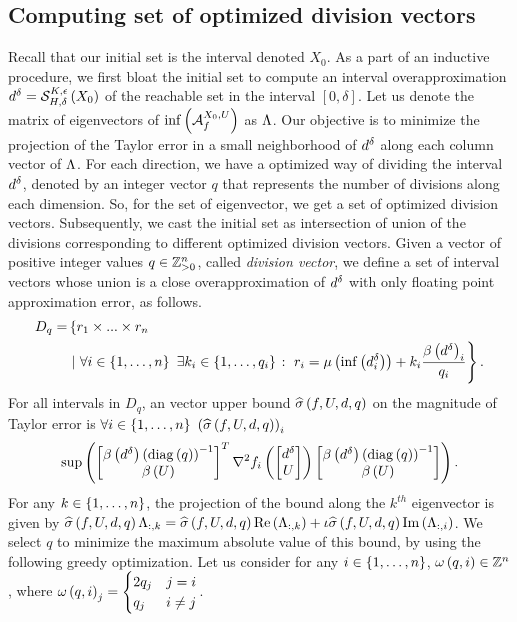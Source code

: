 \subsection{Computing set of optimized division vectors}
Recall that our initial set is the interval denoted $X_0$.  As a part
of an inductive procedure, we first bloat the initial set to compute
an interval overapproximation $d^{\delta}
= \mathcal{S}_{H,\delta}^{K,\epsilon}\left(X_0\right)$ of the reachable set in the
interval $[0,\delta]$.  Let us denote the matrix of eigenvectors of
$\inf\left(\mathcal{A}_{f}^{X_0,U}\right)$ as $\Lambda$.  Our objective is to minimize
the projection of the Taylor error in a small neighborhood of $d^{\delta}$
along each column vector of $\Lambda$.  For each direction, we have a
optimized way of dividing the interval $d^{\delta}$, denoted by an
integer vector $q$ that represents the number of divisions along each
dimension.  So, for the set of eigenvector, we get a set of optimized
division vectors.  Subsequently, we cast the initial set as
intersection of union of the divisions corresponding to different
optimized division vectors.  Given a vector of positive integer values
$q\in\mathbb{Z}_{>0}^n$, called \emph{division vector}, we define a set
of interval vectors whose union is a close overapproximation of
$d^{\delta}$ with only floating point approximation error, as follows.
%
\begin{align*}
D_q
= & \left\{r_1\times...\times r_n\right.\\
& \left.\left|~\forall i\in\left\{1,\ldots,n\right\}~\exists k_i\in\left\{1,\ldots,q_i\right\}\right.:~r_i
= \mu\left(\inf\left(d^\delta_i\right)\right)+k_i\frac{\beta\left(d^\delta\right)_i}{q_i}\right\}.
\end{align*}
%
For all intervals in $D_q$, an vector upper bound
$\widehat{\sigma}\left(f,U,d,q\right)$ on the magnitude of Taylor error is
$\forall i\in\left\{1,\ldots,n\right\}~\left(\widehat{\sigma}\left(f,U,d,q\right)\right)_i$
%
\begin{align*}
\sup\left(\begin{bmatrix}\beta\left(d^{\delta}\right)\left(\operatorname{diag}\left(q\right)\right)^{-1}\\ \beta\left(U\right)\end{bmatrix}^T{\nabla^2
f_i}\left(\begin{bmatrix}d^{\delta}\\ U\end{bmatrix}\right)\begin{bmatrix}\beta\left(d^{\delta}\right)\left(\operatorname{diag}\left(q\right)\right)^{-1}\\ \beta\left(U\right)\end{bmatrix}\right).
\end{align*}
%
For any $k\in\left\{1,\ldots,n\right\}$, the projection of the  bound
along the $k^{th}$ eigenvector is given by
$\widehat{\sigma}\left(f,U,d,q\right)\Lambda_{:,k}
= \widehat{\sigma}\left(f,U,d,q\right)\operatorname{Re}\left(\Lambda_{:,k}\right)
+ \iota\widehat{\sigma}\left(f,U,d,q\right)\operatorname{Im}\left(\Lambda_{:,i}\right)$.  We select $q$ to
minimize the maximum absolute value of this bound, by using the
following greedy optimization.  Let us consider for any
$i\in\left\{1,\ldots,n\right\}$, \mbox{$\omega\left(q,i\right)\in\mathbb{Z}^n$}, where $\omega\left(q,i\right)_j
= \begin{cases}2q_j & j=i\\ q_j & i\neq j \end{cases}$.

